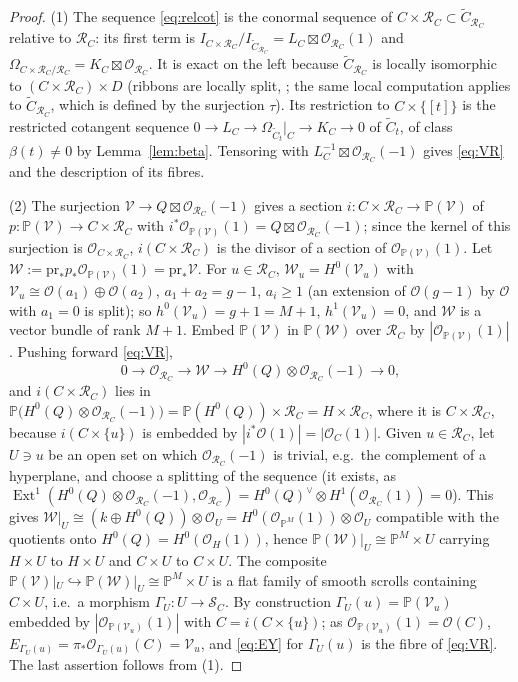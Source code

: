 \documentclass[11pt,twoside]{amsart}
\theoremstyle{plain}
\theoremstyle{definition}
\newcommand{\PP}{\mathbb{P}}
\newcommand{\PM}{\mathbb{P}^M}
\newcommand{\OO}{\mathcal{O}}
\newcommand{\Ext}{\operatorname{Ext}}
\newcommand{\Ct}{\widetilde{C}}
\newcommand{\SC}{\mathcal{S}_C}
\newcommand{\RC}{\mathcal{R}_C}
\newcommand{\Dd}{D}
\newcommand{\pr}{\mathrm{pr}}
\begin{document}
\begin{proof}
(1) The sequence \eqref{eq:relcot} is the conormal sequence of $C\times\RC\subset\Ct_{\RC}$ relative to $\RC$: its first term is $I_{C\times\RC}/I_{\Ct_{\RC}}=L_C\boxtimes\OO_{\RC}(1)$ and $\Omega_{C\times\RC/\RC}=K_C\boxtimes\OO_{\RC}$. It is exact on the left because $\Ct_{\RC}$ is locally isomorphic to $(C\times\RC)\times\Dd$ (ribbons are locally split, \cite[\S1]{BE95}; the same local computation applies to $\Ct_{\RC}$, which is defined by the surjection $\tau$). Its restriction to $C\times\{[t]\}$ is the restricted cotangent sequence $0\to L_C\to\Omega_{\Ct_t}|_C\to K_C\to0$ of $\Ct_t$, of class $\beta(t)\ne0$ by Lemma~\ref{lem:beta}. Tensoring with $L_C^{-1}\boxtimes\OO_{\RC}(-1)$ gives \eqref{eq:VR} and the description of its fibres.

(2) The surjection $\mathcal{V}\to Q\boxtimes\OO_{\RC}(-1)$ gives a section $i\colon C\times\RC\to\PP(\mathcal{V})$ of $p\colon\PP(\mathcal{V})\to C\times\RC$ with $i^*\OO_{\PP(\mathcal{V})}(1)=Q\boxtimes\OO_{\RC}(-1)$; since the kernel of this surjection is $\OO_{C\times\RC}$, $i(C\times\RC)$ is the divisor of a section of $\OO_{\PP(\mathcal{V})}(1)$. Let $\mathcal{W}:=\pr_*p_*\OO_{\PP(\mathcal{V})}(1)=\pr_*\mathcal{V}$. For $u\in\RC$, $\mathcal{W}_u=H^0(\mathcal{V}_u)$ with $\mathcal{V}_u\cong\OO(a_1)\oplus\OO(a_2)$, $a_1+a_2=g-1$, $a_i\ge1$ (an extension of $\OO(g-1)$ by $\OO$ with $a_1=0$ is split); so $h^0(\mathcal{V}_u)=g+1=M+1$, $h^1(\mathcal{V}_u)=0$, and $\mathcal{W}$ is a vector bundle of rank $M+1$. Embed $\PP(\mathcal{V})$ in $\PP(\mathcal{W})$ over $\RC$ by $|\OO_{\PP(\mathcal{V})}(1)|$. Pushing forward \eqref{eq:VR},
\[
0\to\OO_{\RC}\to\mathcal{W}\to H^0(Q)\otimes\OO_{\RC}(-1)\to0,
\]
and $i(C\times\RC)$ lies in $\PP\big(H^0(Q)\otimes\OO_{\RC}(-1)\big)=\PP(H^0(Q))\times\RC=H\times\RC$, where it is $C\times\RC$, because $i(C\times\{u\})$ is embedded by $|i^*\OO(1)|=|\OO_C(1)|$. Given $u\in\RC$, let $U\ni u$ be an open set on which $\OO_{\RC}(-1)$ is trivial, e.g.\ the complement of a hyperplane, and choose a splitting of the sequence (it exists, as $\Ext^1(H^0(Q)\otimes\OO_{\RC}(-1),\OO_{\RC})=H^0(Q)^{\vee}\otimes H^1(\OO_{\RC}(1))=0$). This gives $\mathcal{W}|_U\cong(k\oplus H^0(Q))\otimes\OO_U=H^0(\OO_{\PM}(1))\otimes\OO_U$ compatible with the quotients onto $H^0(Q)=H^0(\OO_H(1))$, hence $\PP(\mathcal{W})|_U\cong\PM\times U$ carrying $H\times U$ to $H\times U$ and $C\times U$ to $C\times U$. The composite $\PP(\mathcal{V})|_U\hookrightarrow\PP(\mathcal{W})|_U\cong\PM\times U$ is a flat family of smooth scrolls containing $C\times U$, i.e.\ a morphism $\Gamma_U\colon U\to\SC$. By construction $\Gamma_U(u)=\PP(\mathcal{V}_u)$ embedded by $|\OO_{\PP(\mathcal{V}_u)}(1)|$ with $C=i(C\times\{u\})$; as $\OO_{\PP(\mathcal{V}_u)}(1)=\OO(C)$, $E_{\Gamma_U(u)}=\pi_*\OO_{\Gamma_U(u)}(C)=\mathcal{V}_u$, and \eqref{eq:EY} for $\Gamma_U(u)$ is the fibre of \eqref{eq:VR}. The last assertion follows from (1).
\end{proof}
\end{document}
